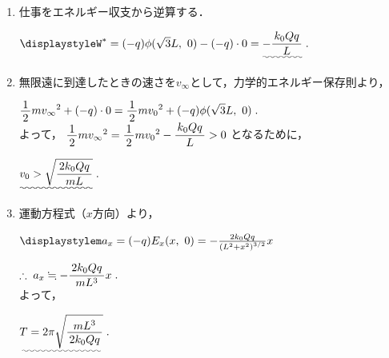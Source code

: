 \documentclass[../../../uem_phy_std_a.tex]{subfiles}
\begin{document}
\begin{enumerate}
            \myspaceb%
            $\displaystyle%
                \uwave{v_0 > \sqrt{\myfracc{2k_0 Qq}{mL}}} \;.
            $
        \item%
            仕事をエネルギー収支から逆算する．
            
            \myspaceb%
            $\displaystyle%
                W^* = (-q) \phi (\sqrt{3}L,\myspacea 0) - (-q) \cdot 0%
                = \uwave{- \myfracc{k_0 Qq}{L}}\;.
            $
        \item%
            無限遠に到達したときの速さを$v_\infty$として，力学的エネルギー保存則より，
            
            \myspaceb%
            $\displaystyle%
                \myfraca{1}{2}m{v_\infty}^2 + (-q) \cdot 0
                = \myfraca{1}{2}m{v_0}^2 + (-q) \phi(\sqrt{3}L,\myspacea 0) \;. 
            $\\
            よって，%
            $\myfraca{1}{2}m{v_\infty}^2%
            =\myfraca{1}{2}m{v_0}^2 - \myfracc{k_0 Qq}{L} > 0$%
            となるために，
            
            \myspaceb%
            $\displaystyle%
                \uwave{v_0 > \sqrt{\myfracc{2k_0 Qq}{mL}}} \;.
            $
        \item%
            運動方程式（$x$方向）より，
            
            \myspaceb%
            $\displaystyle%
                m a_x = (-q) E_x(x,\myspacea 0)
                = -\frac{2k_0 Qq}{\left(L^2+x^2\right)^{3/2}} x
            $

            \myspaceb%
            $\displaystyle%
                \therefore \; a_x \fallingdotseq -\myfracc{2k_0 Qq}{mL^3} x \;.
            $\\
            よって，
            
            \myspaceb%
            $\displaystyle%
                \uwave{T = 2\pi \sqrt{\myfraca{mL^3}{2k_0 Qq}}} \;.
            $
    \end{enumerate}
\end{document}
